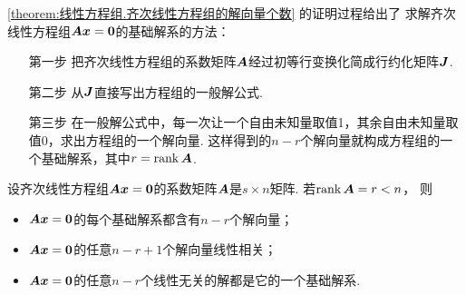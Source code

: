 \begin{remark}
\cref{theorem:线性方程组.齐次线性方程组的解向量个数} 的证明过程给出了
求解齐次线性方程组\(\boldsymbol{A}\boldsymbol{x}=\boldsymbol0\)的基础解系的方法：
\begin{enumerate}
	\item[第一步] 把齐次线性方程组的系数矩阵\(\boldsymbol{A}\)经过初等行变换化简成行约化矩阵\(\boldsymbol{J}\).
	\item[第二步] 从\(\boldsymbol{J}\)直接写出方程组的一般解公式.
	\item[第三步] 在一般解公式中，每一次让一个自由未知量取值1，其余自由未知量取值0，求出方程组的一个解向量.
	这样得到的\(n-r\)个解向量就构成方程组的一个基础解系，其中\(r=\rank\boldsymbol{A}\).
\end{enumerate}
\end{remark}

\begin{corollary}
设齐次线性方程组\(\boldsymbol{A}\boldsymbol{x}=\boldsymbol0\)的系数矩阵\(\boldsymbol{A}\)是\(s \times n\)矩阵.
若\(\rank\boldsymbol{A} = r < n\)，
则\begin{itemize}
	\item \(\boldsymbol{A}\boldsymbol{x}=\boldsymbol0\)的每个基础解系都含有\(n-r\)个解向量；
	\item \(\boldsymbol{A}\boldsymbol{x}=\boldsymbol0\)的任意\(n-r+1\)个解向量线性相关；
	\item \(\boldsymbol{A}\boldsymbol{x}=\boldsymbol0\)的任意\(n-r\)个线性无关的解都是它的一个基础解系.
\end{itemize}
\end{corollary}

